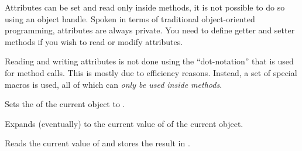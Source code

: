 Attributes can be set and read only inside methods, it is not possible
to do so using an object handle. Spoken in terms of traditional
object-oriented programming, attributes are always private. You need
to define getter and setter methods if you wish to read or modify
attributes.

Reading and writing attributes is not done using the ``dot-notation''
that is used for method calls. This is mostly due to efficiency
reasons. Instead, a set of special macros is used, all of which can
\emph{only be used inside methods}.

\begin{command}{\pgfooset{}}
  Sets the  of the current object to
  . 
\end{command}


\begin{command}{\pgfoovalueof{}}
  Expands  (eventually) to the current value of  of
  the current object.
\end{command}

\begin{command}{\pgfooget{}}
  Reads the current value of  and stores the result in
  .
\end{command}


